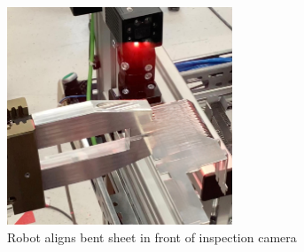 \begin{figure}[h]
    \centering
    \includegraphics[width=0.6\textwidth]{figures/inspection-setup.png}
    \caption{Robot aligns bent sheet in front of inspection camera}
    \label{fig:inspection-setup}
\end{figure}